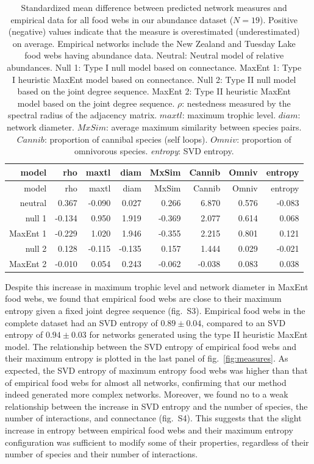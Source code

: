\documentclass[11pt]{article}
\begin{document}
\hypertarget{tbl:measures_abund}{}
\begin{longtable}[]{@{}rrrrrrrr@{}}
\caption{\label{tbl:measures_abund}Standardized mean difference between
predicted network measures and empirical data for all food webs in our
abundance dataset (\(N = 19\)). Positive (negative) values indicate that
the measure is overestimated (underestimated) on average. Empirical
networks include the New Zealand and Tuesday Lake food webs having
abundance data. Neutral: Neutral model of relative abundances. Null 1:
Type I null model based on connectance. MaxEnt 1: Type I heuristic
MaxEnt model based on connectance. Null 2: Type II null model based on
the joint degree sequence. MaxEnt 2: Type II heuristic MaxEnt model
based on the joint degree sequence. \(\rho\): nestedness measured by the
spectral radius of the adjacency matrix. \(maxtl\): maximum trophic
level. \(diam\): network diameter. \(MxSim\): average maximum similarity
between species pairs. \(Cannib\): proportion of cannibal species (self
loops). \(Omniv\): proportion of omnivorous species. \emph{entropy}: SVD
entropy.}\tabularnewline
\toprule
model & rho & maxtl & diam & MxSim & Cannib & Omniv &
entropy\tabularnewline
\midrule
\endfirsthead
\toprule
model & rho & maxtl & diam & MxSim & Cannib & Omniv &
entropy\tabularnewline
\midrule
\endhead
neutral & 0.367 & -0.090 & 0.027 & 0.266 & 6.870 & 0.576 &
-0.083\tabularnewline
null 1 & -0.134 & 0.950 & 1.919 & -0.369 & 2.077 & 0.614 &
0.068\tabularnewline
MaxEnt 1 & -0.229 & 1.020 & 1.946 & -0.355 & 2.215 & 0.801 &
0.121\tabularnewline
null 2 & 0.128 & -0.115 & -0.135 & 0.157 & 1.444 & 0.029 &
-0.021\tabularnewline
MaxEnt 2 & -0.010 & 0.054 & 0.243 & -0.062 & -0.038 & 0.083 &
0.038\tabularnewline
\bottomrule
\end{longtable}

Despite this increase in maximum trophic level and network diameter in
MaxEnt food webs, we found that empirical food webs are close to their
maximum entropy given a fixed joint degree sequence (fig.~S3). Empirical
food webs in the complete dataset had an SVD entropy of
\(0.89 \pm 0.04\), compared to an SVD entropy of \(0.94 \pm 0.03\) for
networks generated using the type II heuristic MaxEnt model. The
relationship between the SVD entropy of empirical food webs and their
maximum entropy is plotted in the last panel of fig.~\ref{fig:measures}.
As expected, the SVD entropy of maximum entropy food webs was higher
than that of empirical food webs for almost all networks, confirming
that our method indeed generated more complex networks. Moreover, we
found no to a weak relationship between the increase in SVD entropy and
the number of species, the number of interactions, and connectance
(fig.~S4). This suggests that the slight increase in entropy between
empirical food webs and their maximum entropy configuration was
sufficient to modify some of their properties, regardless of their
number of species and their number of interactions.
\end{document}
